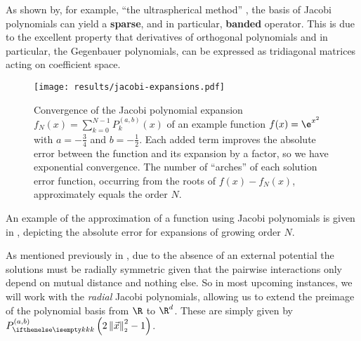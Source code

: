 As shown by, for example, ``the ultraspherical method'' \parencite{2013-a-fast-and-well-conditioned-spectral-method}, the basis of Jacobi polynomials can yield a \textbf{sparse}, and in particular, \textbf{banded} operator.
This is due to the excellent property that derivatives of orthogonal polynomials and in particular, the Gegenbauer polynomials, can be expressed as tridiagonal matrices acting on coefficient space.

\begin{figure}[H]
  \centering
  \texttt{[image: results/jacobi-expansions.pdf]}
  \caption[Convergence of Jacobi basis expansion]{Convergence of the Jacobi polynomial expansion $f_N(x) = \sum_{k=0}^{N-1} P_k^{(a, b)}(x)$ of an example function $f(x) = \e^{x^2}$ with $a = -\frac{3}{4}$ and $b = -\frac{1}{2}$. Each added term improves the absolute error between the function and its expansion by a factor, so we have exponential convergence. The number of ``arches'' of each solution error function, occurring from the roots of $f(x) - f_N(x)$, approximately equals the order $N$.}
  \label{fig:jacobi-expansions-error}
\end{figure}

An example of the approximation of a function using Jacobi polynomials is given in , depicting the absolute error for expansions of growing order $N$.

As mentioned previously in , due to the absence of an external potential the solutions must be radially symmetric given that the pairwise interactions only depend on mutual distance and nothing else.
So in most upcoming instances, we will work with the \textit{radial} Jacobi polynomials, allowing us to extend the preimage of the polynomial basis from $\R$ to $\R^d$.
These are simply given by $\jacobi[k]{x}$.

